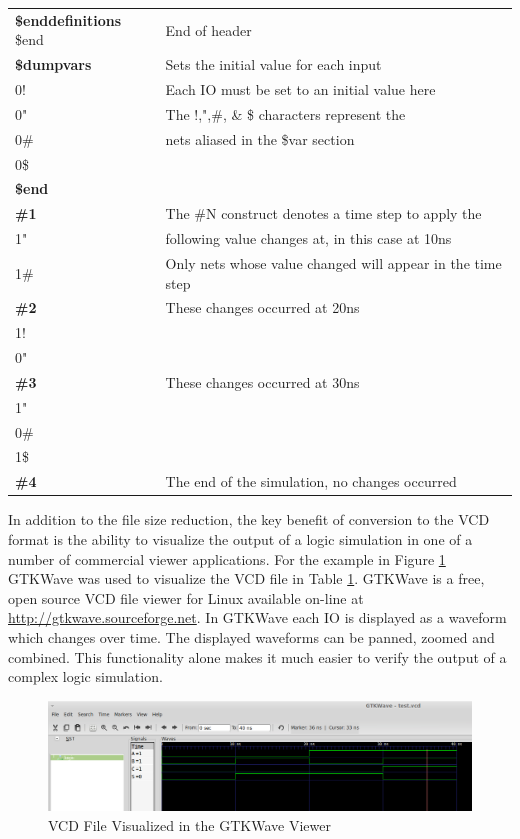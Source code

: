 \documentclass[12pt]{report}
\begin{document}
\begin{table}
\begin{center}
\begin{tabular}{l|l}
			\textbf{\$enddefinitions} \$end & End of header \\
			\textbf{\$dumpvars} & Sets the initial value for each input \\
			0!	& Each IO must be set to an initial value here \\
			0"	& The !,",\#, \& \$ characters represent the\\
			0\# & nets aliased in the \$var section\\
			0\$ & \\
			\textbf{\$end} & \\
			\textbf{\#1} & The \#N construct denotes a time step to apply the \\
			1" & following value changes at, in this case at 10ns \\
			1\# & Only nets whose value changed will appear in the time step\\
			\textbf{\#2} & These changes occurred at 20ns \\ 
			1! & \\
			0" & \\
			\textbf{\#3} & These changes occurred at 30ns\\
			1" & \\
			0\# & \\
			1\$ & \\	
			\textbf{\#4} & The end of the simulation, no changes occurred \\		
		\end{tabular}
    \label{tbl:half_adder_vcd}
	\end{center}
\end{table} 
In addition to the file size reduction, the key benefit of conversion to the VCD format is the ability to visualize the output of a logic simulation in one of a number of commercial viewer applications.  For the example in Figure \ref{fig:half-adder-gtkwave} GTKWave was used to visualize the VCD file in Table \ref{tbl:half_adder_vcd}.  GTKWave is a free, open source VCD file viewer for Linux available on-line at \url{http://gtkwave.sourceforge.net}.  In GTKWave each IO is displayed as a waveform which changes over time.  The displayed waveforms can be panned, zoomed and combined.  This functionality alone makes it much easier to verify the output of a complex logic simulation.  
\begin{figure}
	\begin{center}
		\includegraphics[scale=.4]{images/half-adder-vcd}
	\end{center}
	\caption{VCD File Visualized in the GTKWave Viewer}
	\label{fig:half-adder-gtkwave}
\end{figure}
\end{document}
